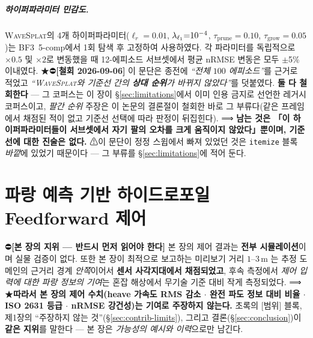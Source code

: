 \documentclass[11pt]{report}
\numberwithin{equation}{chapter}
\numberwithin{figure}{chapter}
\numberwithin{table}{chapter}
\newcommand{\WS}{\textsc{WaveSplat}}
\begin{document}
\paragraph{하이퍼파라미터 민감도.}
\WS{}의 4개 하이퍼파라미터($\ell_r{=}0.01$, $\lambda_{\ell_1}{=}10^{-4}$,
$\tau_{\text{prune}}{=}0.10$, $\tau_{\text{grow}}{=}0.05$)는
BF3~5-comp에서 1회 탐색 후 고정하여 사용하였다.
각 파라미터를 독립적으로 $\times 0.5$ 및 $\times 2$로 변동했을 때
12-에피소드 서브셋에서 평균 nRMSE 변동은 모두 $\pm$5\% 이내였다.
★⛔\textbf{[철회 2026-09-06]} 이 문단은 종전에 \emph{``전체 $100$ 에피소드''}를
근거로 적었고 \emph{``\WS{}와 기준선 간의 \textbf{상대 순위}가 바뀌지 않았다''}를
덧붙였다. \textbf{둘 다 철회한다} --- 그 코퍼스는 이 장이 \S\ref{sec:limitations}에서
이미 인용 금지로 선언한 레거시 코퍼스이고, \emph{팔간 순위} 주장은 이 논문의 결론절이
철회한 바로 그 부류다(같은 프레임에서 채점된 적이 없고 기준선 선택에 따라 판정이 뒤집힌다).
⟹ \textbf{남는 것은 「이 하이퍼파라미터들이 서브셋에서 자기 팔의 오차를 크게 움직이지
않았다」뿐이며, 기준선에 대한 진술은 없다.} ⚠이 문단이 정정 스윕에서 빠져 있었던 것은
\texttt{itemize} 블록 \emph{바깥}에 있었기 때문이다 --- 그 부류를 §\ref{sec:limitations}에 적어 둔다.

\chapter{파랑 예측 기반 하이드로포일 Feedforward 제어}
\label{chap:hydrofoil}


⛔\textbf{[본 장의 지위 --- 반드시 먼저 읽어야 한다]}
본 장의 제어 결과는 \textbf{전부 시뮬레이션}이며 실물 검증이 없다. 또한 본 장이 최적으로
보고하는 미리보기 거리 $1$--$3$\,m 는 추정 도메인의 근거리 경계 \emph{안쪽}이어서
\textbf{센서 사각지대에서 채점되었고}, 후속 측정에서 \emph{제어 입력에 대한 파랑 정보의
기여}는 혼잡 해상에서 무기술 기준 대비 작게 측정되었다.
⟹ ★\textbf{따라서 본 장의 제어 수치(heave 가속도 RMS 감소 $\cdot$ 완전 파도 정보 대비 비율
$\cdot$ ISO 2631 등급 $\cdot$ nRMSE 강건성)는 기여로 주장하지 않는다.}
초록의 [범위] 블록, 제1장의 ``주장하지 않는 것''(\S\ref{sec:contrib-limits}), 그리고
결론(\S\ref{sec:conclusion})이 \textbf{같은 지위}를 말한다 --- 본 장은 \emph{가능성의 예시와
이력}으로만 남긴다.
\end{document}
